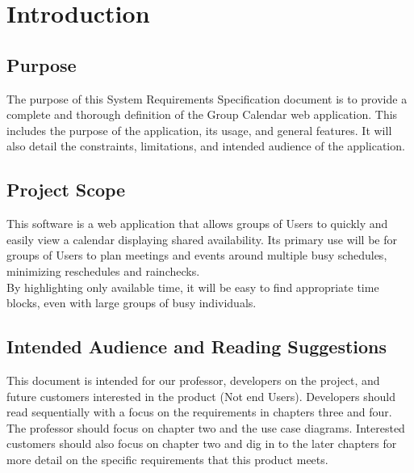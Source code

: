 \documentclass{scrreprt}
\begin{document}
\chapter{Introduction}

\section{Purpose}

The purpose of this System Requirements Specification document is to
provide a complete and thorough definition of the Group Calendar web application.
This includes the purpose of the application, its usage, and general features. It will
also detail the constraints, limitations, and intended audience of the application.


\section{Project Scope}

This software is a web application that allows groups of Users to quickly and easily 
view a calendar displaying shared availability. Its primary use will be for groups of 
Users to plan meetings and events around multiple busy schedules, minimizing 
reschedules and rainchecks.
\\By highlighting only available time, it will be easy to find
appropriate time blocks, even with large groups of busy individuals.


\section{Intended Audience and Reading Suggestions}

This document is intended for our professor, developers on the project, and
future customers interested in the product (Not end Users). Developers should
read sequentially with a focus on the requirements in chapters three and four.
The professor should focus on chapter two and the use case diagrams. Interested
customers should also focus on chapter two and dig in to the later chapters for
more detail on the specific requirements that this product meets.
\end{document}
